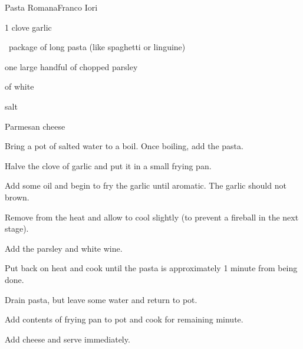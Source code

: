 \begin{recipe}{Pasta Romana}{Franco Iori}{}

\begin{ingredients}
\item 1 clove garlic
\item \half{}~package of long pasta (like spaghetti or linguine)
\item one large handful of chopped parsley
\item \C{\half} of white 
\item {}
\item salt
\item Parmesan cheese
\end{ingredients}

\begin{directions}
\item Bring a pot of salted water to a boil. Once boiling, add the pasta.
\item Halve the clove of garlic and put it in a small frying pan.
\item Add some oil and begin to fry the garlic until aromatic. The garlic should not brown.
\item Remove from the heat and allow to cool slightly (to prevent a fireball in the next stage).
\item Add the parsley and white wine.
\item Put back on heat and cook until the pasta is approximately 1 minute from being done.
\item Drain pasta, but leave some water and return to pot.
\item Add contents of frying pan to pot and cook for remaining minute.
\item Add cheese and serve immediately.
\end{directions}

\end{recipe}
